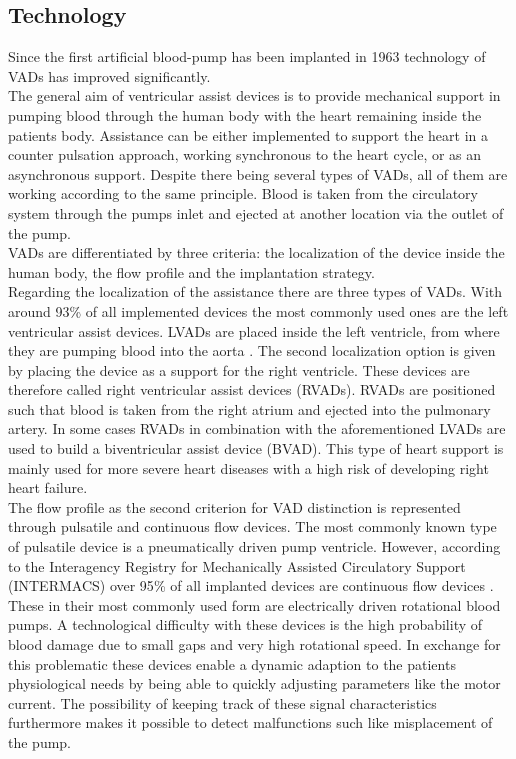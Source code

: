 \subsection{Technology}
Since the first artificial blood-pump has been implanted in 1963 \cite{VAD9} technology of VADs has improved significantly.
\\The general aim of ventricular assist devices is to provide mechanical support in pumping blood through the human body with the heart remaining inside the patients body. Assistance can be either implemented to support the heart in a counter pulsation approach, working synchronous to the heart cycle, or as an asynchronous support. Despite there being several types of VADs, all of them are working according to the same principle. Blood is taken from the circulatory system through the pumps inlet and ejected at another location via the outlet of the pump.\cite{VAD1}
\\VADs are differentiated by three criteria: the localization of the device inside the human body, the flow profile and the implantation strategy.
\\Regarding the localization of the assistance there are three types of VADs. With around 93{\%} of all implemented devices the most commonly used ones are the left ventricular assist devices.\cite{VAD7} LVADs are placed inside the left ventricle, from where they are pumping blood into the aorta \cite{VAD4}. The second localization option is given by placing the device as a support for  the right ventricle. These devices are therefore called right ventricular assist devices (RVADs). RVADs are positioned such that blood is taken from the right atrium and ejected into the pulmonary artery. \cite{VAD7} In some cases RVADs in combination with the aforementioned LVADs are used to build a biventricular assist device (BVAD). This type of heart support is mainly used for more severe heart diseases with a high risk of developing right heart failure. \cite{VAD11}
\\The flow profile as the second criterion for VAD distinction is represented through pulsatile and continuous flow devices. The most commonly known type of pulsatile device is a pneumatically driven pump ventricle. \cite{VAD1}
However, according to the Interagency Registry for Mechanically Assisted Circulatory Support (INTERMACS) over 95{\%} of all implanted devices are continuous flow devices \cite{VAD8}. These in their most commonly used form are electrically driven rotational blood pumps. A technological difficulty with these devices is the high probability of blood damage due to small gaps and very high rotational speed. In exchange for this problematic these devices enable a dynamic adaption to the patients physiological needs by being able to quickly adjusting parameters like the motor current. The possibility of keeping track of these signal characteristics furthermore makes it possible to detect malfunctions such like misplacement of the pump. \cite{VAD1}
